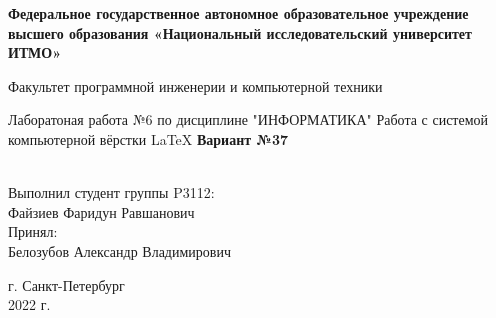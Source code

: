 \pagestyle{empty}

\begin{center}
\begin{huge}

\textbf{Федеральное государственное автономное образовательное учреждение\linebreak
высшего образования «Национальный исследовательский университет\linebreak
ИТМО»}\linebreak


Факультет программной инженерии и компьютерной техники

\vspace*{\fill}
Лаборатоная работа №6\linebreak
по дисциплине "ИНФОРМАТИКА"\linebreak
Работа с системой компьютерной вёрстки \LaTeX\linebreak
\textbf{Вариант №37}\linebreak
\vspace*{\fill}

\begin{raggedleft}
\\
Выполнил студент группы P3112:\\
Файзиев Фаридун Равшанович\\
Принял:\\
Белозубов Александр Владимирович\\

\end{raggedleft}

\vspace*{\fill}
г. Санкт-Петербург\\
2022 г.

\end{huge}
\end{center}

\newpage